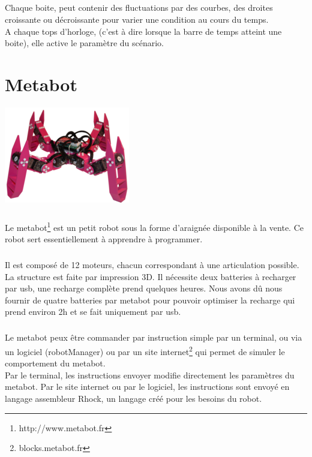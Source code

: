 \documentclass[10pt,a4paper]{report}
\begin{document}
\paragraph{}
Chaque boite, peut contenir des fluctuations par des courbes, des droites croissante ou décroissante pour varier une condition au cours du temps.
\\
A chaque tops d'horloge, (c'est à dire lorsque la barre de temps atteint une boite), elle active le paramètre du scénario.

\chapter{Metabot}
\begin{center}
\includegraphics[scale=0.5]{image/metabot.jpg}
\end{center}

\paragraph{}
Le metabot\footnote{http://www.metabot.fr} est un petit robot sous la forme d'araignée disponible à la vente. Ce robot sert essentiellement à apprendre à programmer.
\paragraph{}
Il est composé de 12 moteurs, chacun correspondant à une articulation possible. La structure est faite par impression 3D. 
Il nécessite deux batteries à recharger par usb, une recharge complète prend quelques heures. Nous avons dû nous fournir de quatre batteries par metabot pour pouvoir optimiser la recharge qui prend environ 2h et se fait uniquement par usb.
\paragraph{}
Le metabot peux être commander par instruction simple par un terminal, ou via un logiciel (robotManager) ou par un site internet\footnote{blocks.metabot.fr} qui permet de simuler le comportement du metabot.
\\
Par le terminal, les instructions envoyer modifie directement les paramètres du metabot. Par le site internet ou par le logiciel, les instructions sont envoyé en langage assembleur Rhock, un langage créé pour les besoins du robot.
\end{document}
